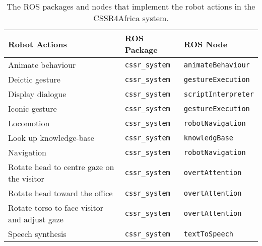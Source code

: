 \documentclass{CSSRforAfrica}
\begin{document}
\begin{table}[thb]
\begin{center}
\begin{tabular}{|l l l|}
\hline 
Robot Actions                                & ROS Package                                                  &  ROS Node       \\
\hline
{\small Animate behaviour }	                                  & {\small \verb+cssr_system+}     & {\small \verb+animateBehaviour+} \\
{\small Deictic gesture }                                          & {\small \verb+cssr_system+}       & {\small \verb+gestureExecution+} \\
{\small Display dialogue }                                       & {\small \verb+cssr_system+}       &  {\small \verb+scriptInterpreter+}  \\
{\small Iconic gesture}                                             & {\small \verb+cssr_system+}      & {\small \verb+gestureExecution+}  \\
{\small Locomotion }                                                 & {\small \verb+cssr_system+}     & {\small \verb+robotNavigation+}  \\
{\small Look up knowledge-base }                           & {\small \verb+cssr_system+}      &  {\small \verb+knowledgBase+}  \\
{\small Navigation  }                                               & {\small \verb+cssr_system+}       & {\small \verb+robotNavigation+}  \\
{\small Rotate head to centre gaze on the visitor }   &  {\small \verb+cssr_system+}     & {\small \verb+overtAttention+} \\
{\small Rotate head toward the office}                      &  {\small \verb+cssr_system+}    & {\small \verb+overtAttention+} \\
{\small Rotate torso to face visitor and adjust gaze}  &  {\small \verb+cssr_system+}  & {\small \verb+overtAttention+} \\
{\small Speech synthesis}                                         &  {\small \verb+cssr_system+}    & {\small \verb+textToSpeech+} \\
\hline
\end{tabular}
\end{center}
\caption{The ROS packages and nodes that implement the robot actions in the CSSR4Africa  system.}
\label{table:nodes}
\end{table}
 
\end{document}
